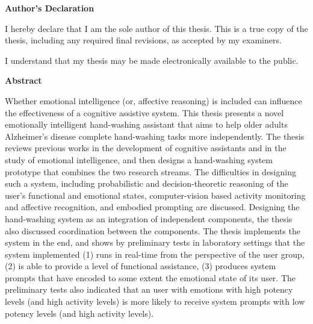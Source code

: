 \cleardoublepage %
 



\begin{center}\textbf{Author's Declaration}\end{center}

  \noindent
I hereby declare that I am the sole author of this thesis. This is a true copy of the thesis, including any required final revisions, as accepted by my examiners.

  \bigskip
  
  \noindent
I understand that my thesis may be made electronically available to the public.

\cleardoublepage


\begin{center}\textbf{Abstract}\end{center}

Whether emotional intelligence (or, affective reasoning) is included can influence the effectiveness of a cognitive assistive system. This thesis presents a novel emotionally intelligent hand-washing assistant that aims to help older adults Alzheimer's disease complete hand-washing tasks more independently. The thesis reviews previous works in the development of cognitive assistants and in the study of emotional intelligence, and then designs a hand-washing system prototype that combines the two research streams. The difficulties in designing such a system, including probabilistic and decision-theoretic reasoning of the user's functional and emotional states, computer-vision based activity monitoring and affective recognition, and embodied prompting are discussed. Designing the hand-washing system as an integration of independent components, the thesis also discussed coordination between the components. The thesis implements the system in the end, and shows by preliminary tests in laboratory settings that the system implemented (1) runs in real-time from the perspective of the user group, (2) is able to provide a level of functional assistance, (3) produces system prompts that have encoded to some extent the emotional state of its user. The preliminary tests also indicated that an user with emotions with high potency levels (and high activity levels) is more likely to receive system prompts with low potency levels (and high activity levels).

